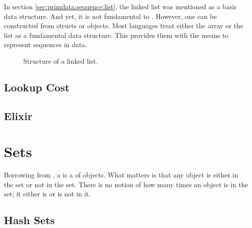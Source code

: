 In section \ref{sec:primdata:sequence:list}, the linked list was mentioned as a basic data structure. And yet, it is not fundamental to \csharp. However, one can be constructed from structs or objects. Most languages treat either the array or the list as a fundamental data structure. This provides them with the means to represent sequences in data.

\begin{figure}[tbp]
  
  \caption{Structure of a linked list.}
  \label{fig:collections:linkedlist}
\end{figure}

\subsection{Lookup Cost}

\subsection{\csharp}
\subsection{Elixir}

\section{Sets}

Borrowing from , a  is a  of  objects. What matters is that any object is either in the set or not in the set. There is no notion of how many times an object is in the set; it either is or is not in it.

\subsection{Hash Sets}
\label{sec:collections:hashset}

